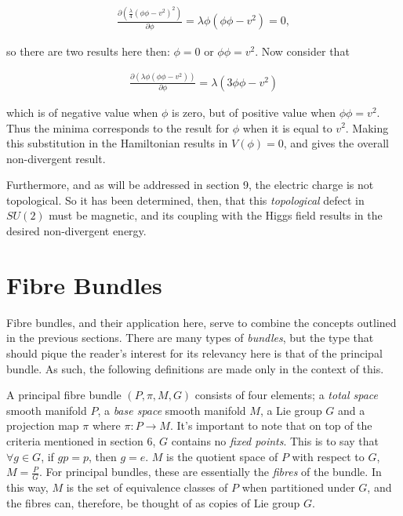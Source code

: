 \documentclass[fleqn, twocolumn, 10pt]{article}
\begin{document}
\begin{ceqn}
\begin{align*}
\frac{\partial (\frac{\lambda}{4}(\phi \phi - v^2)^2)}{\partial \phi} = \lambda\phi(\phi \phi - v^2) = 0,
\end{align*}
\end{ceqn}
so there are two results here then: $\phi = 0$ or $\phi\phi = v^2$. Now consider that 

\begin{ceqn}
\begin{align*}
\frac{\partial  (\lambda\phi(\phi \phi - v^2))}{\partial \phi} = \lambda(3\phi \phi - v^2)
\end{align*}
\end{ceqn}
which is of negative value when $\phi$ is zero, but of positive value when $\phi\phi = v^2$. Thus the minima corresponds to the result for $\phi$ when it is equal to $v^2$. Making this substitution in the Hamiltonian results in $V(\phi) = 0$, and gives the overall non-divergent result. 

Furthermore, and as will be addressed in section 9, the electric charge is not topological. So it has been determined, then, that this \textit{topological} defect in $SU(2)$ must be magnetic, and its coupling with the Higgs field results in the desired non-divergent energy.




\section{Fibre Bundles}

Fibre bundles, and their application here, serve to combine the concepts outlined in the previous sections. There are many types of \textit{bundles}, but the type that should pique the reader's interest for its relevancy here is that of the principal bundle. As such, the following definitions are made only in the context of this. 

A principal fibre bundle $(P, \pi, M, G)$ consists of four elements; a \textit{total space} smooth manifold $P$, a \textit{base space} smooth manifold $M$, a Lie group $G$ and a projection map $\pi$ where $\pi : P \to M$. It's important to note that on top of the criteria mentioned in section 6, $G$ contains no \textit{fixed points}. This is to say that $\forall g \in G$, if $gp = p$, then $g = e$. $M$ is the quotient space of $P$ with respect to $G$, $M = \frac{P}{G}$. For principal bundles, these are essentially the \textit{fibres} of the bundle. In this way, $M$ is the set of equivalence classes of $P$ when partitioned under $G$, and the fibres can, therefore, be thought of as copies of Lie group $G$.
\end{document}
